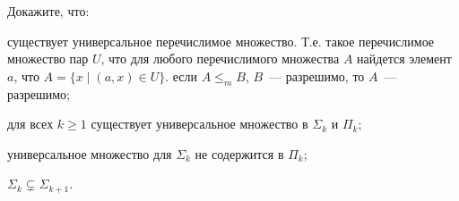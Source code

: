 Докажите, что:
\begin{enumcyr}
    \item существует универсальное перечислимое множество. Т.е. такое перечислимое множество пар $U$, что для любого
	    перечислимого множества $A$ найдется элемент $a$, что $A = \{x \mid (a, x) \in U\}$. если $A {\le}_{m} B$, $B$~---
        разрешимо, то $A$~--- разрешимо;
    \item для всех $k \ge 1$ существует универсальное множество в $\Sigma_k$ и $\Pi_k$;
    \item универсальное множество для $\Sigma_k$ не содержится в $\Pi_k$;
    \item $\Sigma_k \subsetneq \Sigma_{k + 1}$.
\end{enumcyr}